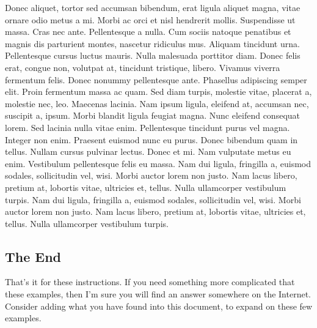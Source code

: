 Donec aliquet, tortor sed accumsan bibendum, erat ligula aliquet magna, vitae ornare odio metus a mi. Morbi ac orci et nisl hendrerit mollis. Suspendisse ut massa. Cras nec ante. Pellentesque a nulla. Cum sociis natoque penatibus et magnis dis parturient montes, nascetur ridiculus mus. Aliquam tincidunt urna. Pellentesque cursus luctus mauris. Nulla malesuada porttitor diam. Donec felis erat, congue non, volutpat at, tincidunt tristique, libero. Vivamus viverra fermentum felis. Donec nonummy pellentesque ante. Phasellus adipiscing semper elit. Proin fermentum massa ac quam. Sed diam turpis, molestie vitae, placerat a, molestie nec, leo. Maecenas lacinia. Nam ipsum ligula, eleifend at, accumsan nec, suscipit a, ipsum. Morbi blandit ligula feugiat magna. Nunc eleifend consequat lorem. Sed lacinia nulla vitae enim. Pellentesque tincidunt purus vel magna. Integer non enim. Praesent euismod nunc eu purus. Donec bibendum quam in tellus. Nullam cursus pulvinar lectus. Donec et mi. Nam vulputate metus eu enim. Vestibulum pellentesque felis eu massa. Nam dui ligula, fringilla a, euismod sodales, sollicitudin vel, wisi. Morbi auctor lorem non justo. Nam lacus libero, pretium at, lobortis vitae, ultricies et, tellus.   Nulla ullamcorper vestibulum turpis. Nam dui ligula, fringilla a, euismod sodales, sollicitudin vel, wisi. Morbi auctor lorem non justo. Nam lacus libero, pretium at, lobortis vitae, ultricies et, tellus.   Nulla ullamcorper vestibulum turpis.

\subsection*{The End}

That's it for these instructions.  If you need something more complicated that these examples, then I'm sure you will find an answer somewhere on the Internet.  Consider adding what you have found into this document, to expand on these few examples.  

\hfill

